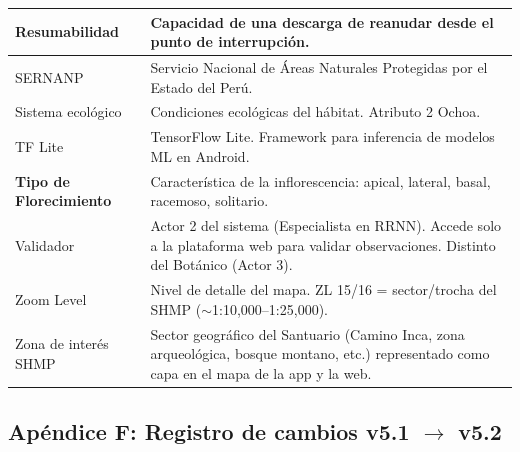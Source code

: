 \documentclass[12pt, a4paper]{article}
\begin{document}
\begin{longtable}{|p{3.5cm}|p{11cm}|}
\hline
Resumabilidad & Capacidad de una descarga de reanudar desde el punto de interrupci\'on. \\
\hline
SERNANP & Servicio Nacional de \'Areas Naturales Protegidas por el Estado del Per\'u. \\
\hline
Sistema ecol\'ogico & Condiciones ecol\'ogicas del h\'abitat. Atributo 2 Ochoa. \\
\hline
TF Lite & TensorFlow Lite. Framework para inferencia de modelos ML en Android. \\
\hline
\textbf{Tipo de Florecimiento} & Caracter\'istica de la inflorescencia: apical, lateral, basal, racemoso, solitario. \\
\hline
Validador & Actor 2 del sistema (Especialista en RRNN). Accede solo a la plataforma web para validar observaciones. Distinto del Bot\'anico (Actor 3). \\
\hline
Zoom Level & Nivel de detalle del mapa. ZL 15/16 = sector/trocha del SHMP ($\sim$1:10,000--1:25,000). \\
\hline
Zona de inter\'es SHMP & Sector geogr\'afico del Santuario (Camino Inca, zona arqueol\'ogica, bosque montano, etc.) representado como capa en el mapa de la app y la web. \\
\hline
\end{longtable}

\subsection{Ap\'endice F: Registro de cambios v5.1 $\rightarrow$ v5.2}
\end{document}
